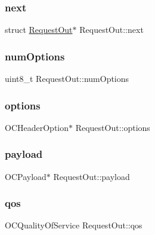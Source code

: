 \hypertarget{struct_request_out_ae6b5027e17598a7dfd6ac08303bddfed}{}\label{struct_request_out_ae6b5027e17598a7dfd6ac08303bddfed} 
\subsubsection{\texorpdfstring{next}{next}}
{\footnotesize\ttfamily struct \hyperlink{struct_request_out}{Request\+Out}$\ast$ Request\+Out\+::next}

\hypertarget{struct_request_out_aa761589b7155d44791458d884faeeee8}{}\label{struct_request_out_aa761589b7155d44791458d884faeeee8} 
\subsubsection{\texorpdfstring{num\+Options}{numOptions}}
{\footnotesize\ttfamily uint8\+\_\+t Request\+Out\+::num\+Options}

\hypertarget{struct_request_out_a4dcfc3ac32de5eda001be32ed6912c68}{}\label{struct_request_out_a4dcfc3ac32de5eda001be32ed6912c68} 
\subsubsection{\texorpdfstring{options}{options}}
{\footnotesize\ttfamily O\+C\+Header\+Option$\ast$ Request\+Out\+::options}

\hypertarget{struct_request_out_a39145cad7d7a6732d098a907c9ad745c}{}\label{struct_request_out_a39145cad7d7a6732d098a907c9ad745c} 
\subsubsection{\texorpdfstring{payload}{payload}}
{\footnotesize\ttfamily O\+C\+Payload$\ast$ Request\+Out\+::payload}

\hypertarget{struct_request_out_adac9861e9a95ece1b7dcf860f9df4e95}{}\label{struct_request_out_adac9861e9a95ece1b7dcf860f9df4e95} 
\subsubsection{\texorpdfstring{qos}{qos}}
{\footnotesize\ttfamily O\+C\+Quality\+Of\+Service Request\+Out\+::qos}

